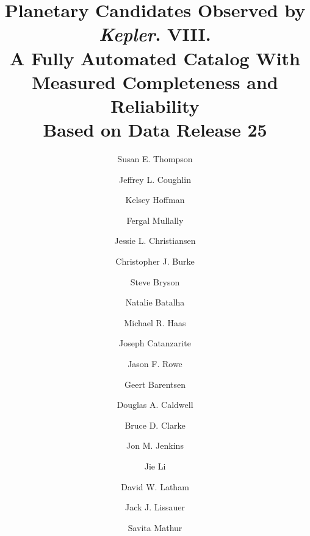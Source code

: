 \documentclass[twocolumn,tighten,trackchanges]{aastex61}
\renewcommand{\_}{\discretionary{\underscore}{}{\underscore}}  %
\newcommand\Kepler{\textit{Kepler}}
\begin{document}

\title{Planetary Candidates Observed by \Kepler. VIII.\\
A Fully Automated Catalog With Measured Completeness and Reliability\\Based on Data Release 25 }

%
\author[0000-0001-7106-4683]{Susan E. Thompson}
\affiliation{\seti}
\affiliation{\nasa}
\affiliation{\stsci}

\author[0000-0003-1634-9672]{Jeffrey L. Coughlin}
\affiliation{\nasa}
\affiliation{\seti}

\author{Kelsey Hoffman}
\affiliation{\seti}

\author{Fergal Mullally}
\affiliation{\seti}
\affiliation{\nasa}
\affiliation{\orbital}

\author{Jessie L. Christiansen}
\affiliation{\nexsci}

\author{Christopher J. Burke}
\affiliation{\nasa}
\affiliation{\seti}
\affiliation{\mitadd}

\author{Steve Bryson}
\affiliation{\nasa}

\author{Natalie Batalha}
\affiliation{\nasa}

\author{Michael R. Haas}
\affiliation{\nasa}


\author{Joseph Catanzarite}
\affiliation{\seti}
\affiliation{\nasa}

\author[0000-0002-5904-1865]{Jason F. Rowe}
\affiliation{\bishop}

\author{Geert Barentsen}
\affiliation{\bari}


\author{Douglas A. Caldwell}
\affiliation{\seti}
\affiliation{\nasa}


\author{Bruce D. Clarke}
\affiliation{\seti}
\affiliation{\nasa}

\author[0000-0002-4715-9460]{Jon M. Jenkins}
\affiliation{\nasa}

\author{Jie Li}
\affiliation{\seti}

\author[0000-0001-9911-7388]{David W. Latham}
\affiliation{\cfa}

\author{Jack J. Lissauer}
\affiliation{\nasa}

\author{Savita Mathur}
\end{document}
